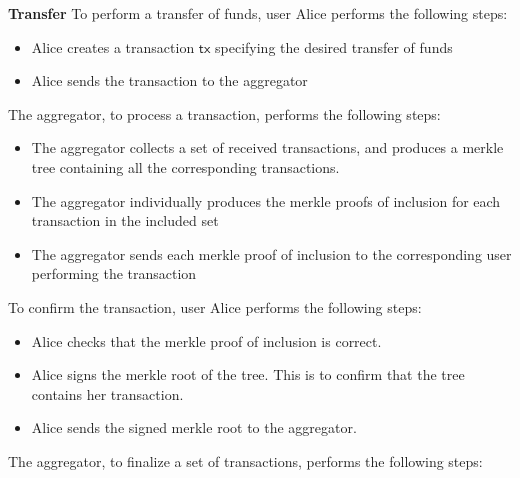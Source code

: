 \begin{Protocol*}[ht!]
\begin{mdframed}

\textbf{Transfer}
\smallbreak
To perform a transfer of funds, user Alice performs the following steps:
\vspace{-1mm}
\begin{itemize}
    \setlength\itemsep{0.15em}
    
    \item Alice creates a transaction $\mathsf{tx}$ specifying the desired transfer of funds

    \item Alice sends the transaction to the aggregator
    
\end{itemize}

The aggregator, to process a transaction, performs the following steps:
\vspace{-1mm}
\begin{itemize}
    \setlength\itemsep{0.15em}
    
    \item The aggregator collects a set of received transactions, and produces a merkle tree containing all the corresponding transactions. 

    \item The aggregator individually produces the merkle proofs of inclusion for each transaction in the included set
    
    \item The aggregator sends each merkle proof of inclusion to the corresponding user performing the transaction
\end{itemize}

To confirm the transaction, user Alice performs the following steps:
\vspace{-1mm}
\begin{itemize}
    \setlength\itemsep{0.15em}
    
    \item Alice checks that the merkle proof of inclusion is correct.

    \item Alice signs the merkle root of the tree. This is to confirm that the tree contains her transaction.
    
    \item Alice sends the signed merkle root to the aggregator. 
\end{itemize}

The aggregator, to finalize a set of transactions, performs the following steps:
\vspace{-1mm}
\begin{itemize}
    \setlength\itemsep{0.15em}
    

\end{itemize}
\end{mdframed}
\end{Protocol*}
